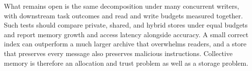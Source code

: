 What remains open is the same decomposition under many concurrent writers, with downstream task outcomes and read and write budgets measured together. Such tests should compare private, shared, and hybrid stores under equal budgets and report memory growth and access latency alongside accuracy. A small correct index can outperform a much larger archive that overwhelms readers, and a store that preserves every message also preserves malicious instructions. Collective memory is therefore an allocation and trust problem as well as a storage problem.
